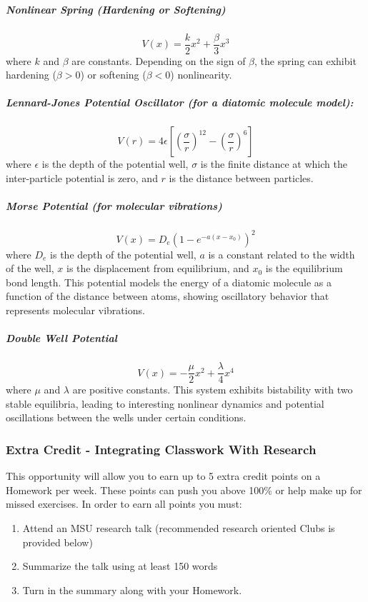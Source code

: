 \documentclass[11pt]{article}
\begin{document}
\subparagraph{Nonlinear Spring (Hardening or
Softening)}\label{nonlinear-spring-hardening-or-softening}

\[ V(x) = \frac{k}{2} x^2 + \frac{\beta}{3} x^3 \] where \(k\) and
\(\beta\) are constants. Depending on the sign of \(\beta\), the spring
can exhibit hardening (\(\beta > 0\)) or softening (\(\beta < 0\))
nonlinearity.

\subparagraph{Lennard-Jones Potential Oscillator (for a diatomic
molecule
model):}\label{lennard-jones-potential-oscillator-for-a-diatomic-molecule-model}

\[ V(r) = 4\epsilon \left[ \left(\frac{\sigma}{r}\right)^{12} - \left(\frac{\sigma}{r}\right)^6 \right] \]
where \(\epsilon\) is the depth of the potential well, \(\sigma\) is the
finite distance at which the inter-particle potential is zero, and \(r\)
is the distance between particles.

\subparagraph{Morse Potential (for molecular
vibrations)}\label{morse-potential-for-molecular-vibrations}

\[ V(x) = D_e \left(1 - e^{-a(x - x_0)}\right)^2 \] where \(D_e\) is the
depth of the potential well, \(a\) is a constant related to the width of
the well, \(x\) is the displacement from equilibrium, and \(x_0\) is the
equilibrium bond length. This potential models the energy of a diatomic
molecule as a function of the distance between atoms, showing
oscillatory behavior that represents molecular vibrations.

\subparagraph{Double Well Potential}\label{double-well-potential}

\[ V(x) = -\frac{\mu}{2} x^2 + \frac{\lambda}{4} x^4 \] where \(\mu\)
and \(\lambda\) are positive constants. This system exhibits bistability
with two stable equilibria, leading to interesting nonlinear dynamics
and potential oscillations between the wells under certain conditions.

    \subsubsection{Extra Credit - Integrating Classwork With
Research}\label{extra-credit---integrating-classwork-with-research}

This opportunity will allow you to earn up to 5 extra credit points on a
Homework per week. These points can push you above 100\% or help make up
for missed exercises. In order to earn all points you must:

\begin{enumerate}
\def\labelenumi{\arabic{enumi}.}
\item
  Attend an MSU research talk (recommended research oriented Clubs is
  provided below)
\item
  Summarize the talk using at least 150 words
\item
  Turn in the summary along with your Homework.
\end{enumerate}
\end{document}
